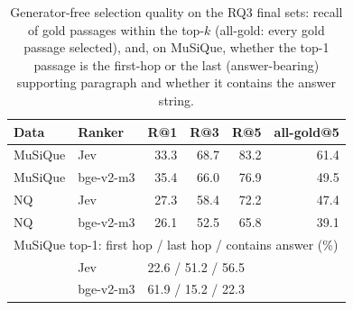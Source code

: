 \begin{table}[tp]
\centering
\scriptsize
\setlength{\tabcolsep}{3pt}
\caption{Generator-free selection quality on the RQ3 final sets: recall of gold passages within the top-$k$ (all-gold: every gold passage selected), and, on MuSiQue, whether the top-1 passage is the first-hop or the last (answer-bearing) supporting paragraph and whether it contains the answer string.}
\label{tab:ragsel}
\begin{tabular}{llrrrr}
\toprule
Data & Ranker & R@1 & R@3 & R@5 & all-gold@5 \\
\midrule
MuSiQue & Jev & 33.3 & 68.7 & 83.2 & 61.4 \\
MuSiQue & bge-v2-m3 & 35.4 & 66.0 & 76.9 & 49.5 \\
NQ & Jev & 27.3 & 58.4 & 72.2 & 47.4 \\
NQ & bge-v2-m3 & 26.1 & 52.5 & 65.8 & 39.1 \\
\midrule
\multicolumn{6}{l}{MuSiQue top-1: \quad first hop / last hop / contains answer (\%)} \\
 & Jev & \multicolumn{4}{l}{22.6 / 51.2 / 56.5} \\
 & bge-v2-m3 & \multicolumn{4}{l}{61.9 / 15.2 / 22.3} \\
\bottomrule
\end{tabular}
\end{table}
